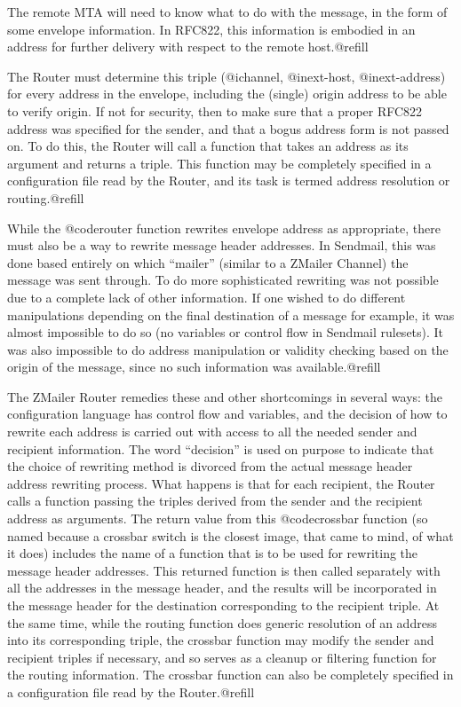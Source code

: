 {The remote MTA will need to know what to do with the message, in the form
of some envelope information.  In RFC822, this information is embodied in
an address for further delivery with respect to the remote host.@refill

The Router must determine this triple (@i{channel}, @i{next-host},
@i{next-address}) for every address in the envelope, including the
(single) origin address to be able to verify origin. If not for
security, then to make sure that a proper RFC822 address was specified
for the sender, and that a bogus address form is not passed on.  To do
this, the Router will call a function that takes an address as its
argument and returns a triple.  This function may be
completely specified in a configuration file read by the Router, and its
task is termed address resolution or routing.@refill

While the @code{router} function rewrites envelope address as appropriate, there
must also be a way to rewrite message header addresses.  In Sendmail, this
was done based entirely on which ``mailer'' (similar to a ZMailer Channel) the
message was sent through.  To do more sophisticated rewriting was not
possible due to a complete lack of other information.  If one wished to do
different manipulations depending on the final destination of a message for
example, it was almost impossible to do so (no variables or control flow in
Sendmail rulesets).  It was also impossible to do address manipulation
or validity checking based on the origin of the message, since no such
information was available.@refill

The ZMailer Router remedies these and other
shortcomings in several ways: the configuration language has control flow
and variables, and the decision of how to rewrite each address is carried out
with access to all the needed sender and recipient information.  The word
``decision'' is used on purpose to indicate that the choice of rewriting method
is divorced from the actual message header address rewriting process.  What
happens is that for each recipient, the Router calls a function passing the
triples derived from the sender and the recipient address as arguments.  The
return value from this @code{crossbar} function (so named because a crossbar
switch is the closest image, that came to mind, of what it does) includes the
name of a function that is to be used for rewriting the message header
addresses.  This returned function is then called separately with all the
addresses in the message header, and the results will be incorporated in the
message header for the destination corresponding to the recipient triple.
At the same time, while the routing function does generic resolution of an
address into its corresponding triple, the crossbar function may modify the
sender and recipient triples if necessary, and so serves as a cleanup or
filtering function for the routing information.  The crossbar function can
also be completely specified in a configuration file read by the Router.@refill

}
